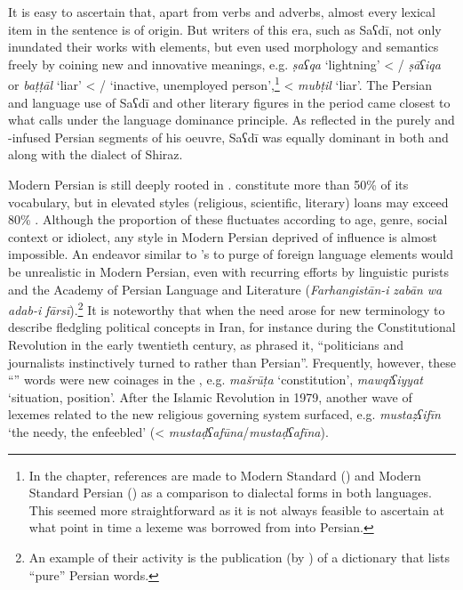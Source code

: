 \documentclass[output=paper]{langsci/langscibook}
\begin{document}
It is easy to ascertain that, apart from verbs and adverbs, almost every lexical item in the sentence is of  origin. But writers of this era, such as Saʕdī, not only inundated their works with  elements, but even used  morphology and semantics freely by coining new and innovative meanings, e.g. \textit{ṣaʕqa} ‘lightning’ < / \textit{ṣāʕiqa} or \textit{baṭṭāl} ‘liar’ < / ‘inactive, unemployed person’,\footnote{In the chapter, references are made to Modern Standard  () and Modern Standard Persian () as a comparison to dialectal forms in both languages. This seemed more straightforward as it is not always feasible to ascertain at what point in time a lexeme was borrowed from  into Persian.} <  \textit{mubṭil} ‘liar’. The Persian and  language use of Saʕdī and other literary figures in the  period came closest to what \citet{Lucas2015} calls  under the language dominance principle. As reflected in the purely  and -infused Persian segments of his oeuvre, Saʕdī was equally dominant in both   and  along with the dialect of Shiraz.

Modern Persian is still deeply rooted in .   constitute more than 50\% of its vocabulary, but in elevated styles (religious, scientific, literary)  loans may exceed 80\% \citep{Jeremiás2011}. Although the proportion of these  fluctuates according to age, genre, social context or idiolect, any style in Modern Persian deprived of  influence is almost impossible. An endeavor similar to ’s to purge  of foreign language elements would be unrealistic in Modern Persian, even with recurring efforts by linguistic purists and the Academy of Persian Language and Literature (\textit{Farhangistān-i} \textit{zabān} \textit{wa} \textit{adab-i} \textit{fārsī}).\footnote{An example of their activity is the publication (by \citealt{Rāzī2004}) of a dictionary that lists “pure” Persian words.} It is noteworthy that when the need arose for new terminology to describe fledgling political concepts in Iran, for instance during the Constitutional Revolution in the early twentieth\textsuperscript{} century, as \citet{Elwell-Sutton2000} phrased it, “politicians and journalists instinctively turned to  rather than Persian”. Frequently, however, these “” words were new coinages in the , e.g. \textit{mašrūṭa} ‘constitution’, \textit{mawqiʕiyyat} ‘situation, position’. After the Islamic Revolution in 1979, another wave of  lexemes related to the new religious governing system surfaced, e.g. \textit{mustaẓʕifīn} ‘the needy, the enfeebled’ (<  \textit{mustaḍʕafūna}\kern 0.5pt/\kern -1pt\textit{mustaḍʕafīna}).
\end{document}
